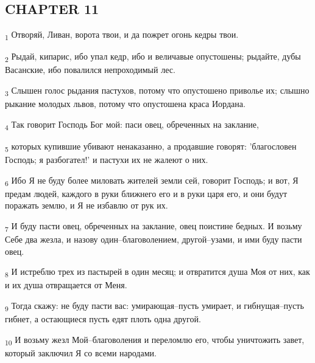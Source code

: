 \subsection{CHAPTER 11}
\begin{tcolorbox}
\textsubscript{1} Отворяй, Ливан, ворота твои, и да пожрет огонь кедры твои.
\end{tcolorbox}
\begin{tcolorbox}
\textsubscript{2} Рыдай, кипарис, ибо упал кедр, ибо и величавые опустошены; рыдайте, дубы Васанские, ибо повалился непроходимый лес.
\end{tcolorbox}
\begin{tcolorbox}
\textsubscript{3} Слышен голос рыдания пастухов, потому что опустошено приволье их; слышно рыкание молодых львов, потому что опустошена краса Иордана.
\end{tcolorbox}
\begin{tcolorbox}
\textsubscript{4} Так говорит Господь Бог мой: паси овец, обреченных на заклание,
\end{tcolorbox}
\begin{tcolorbox}
\textsubscript{5} которых купившие убивают ненаказанно, а продавшие говорят: 'благословен Господь; я разбогател!' и пастухи их не жалеют о них.
\end{tcolorbox}
\begin{tcolorbox}
\textsubscript{6} Ибо Я не буду более миловать жителей земли сей, говорит Господь; и вот, Я предам людей, каждого в руки ближнего его и в руки царя его, и они будут поражать землю, и Я не избавлю от рук их.
\end{tcolorbox}
\begin{tcolorbox}
\textsubscript{7} И буду пасти овец, обреченных на заклание, овец поистине бедных. И возьму Себе два жезла, и назову один--благоволением, другой--узами, и ими буду пасти овец.
\end{tcolorbox}
\begin{tcolorbox}
\textsubscript{8} И истреблю трех из пастырей в один месяц; и отвратится душа Моя от них, как и их душа отвращается от Меня.
\end{tcolorbox}
\begin{tcolorbox}
\textsubscript{9} Тогда скажу: не буду пасти вас: умирающая--пусть умирает, и гибнущая--пусть гибнет, а остающиеся пусть едят плоть одна другой.
\end{tcolorbox}
\begin{tcolorbox}
\textsubscript{10} И возьму жезл Мой--благоволения и переломлю его, чтобы уничтожить завет, который заключил Я со всеми народами.
\end{tcolorbox}
